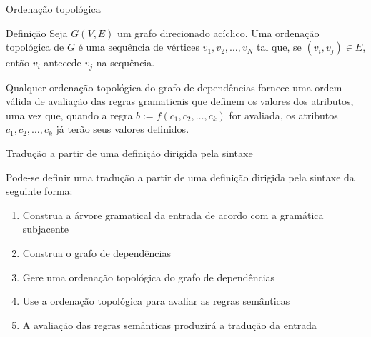 \begin{frame}[fragile]{Ordenação topológica}

    \begin{block}{Definição}
        Seja $G(V, E)$ um grafo direcionado acíclico. Uma ordenação topológica de $G$ é uma sequência de vértices $v_1, v_2, \ldots, v_N$ tal que, se 
            $(v_i, v_j)\in E$, então $v_i$ antecede $v_j$ na sequência.
    \end{block}

    \vspace{0.2in}

    Qualquer ordenação topológica do grafo de dependências fornece uma ordem válida de avaliação das regras gramaticais que definem os valores dos atributos, uma
        vez que, quando a regra $b := f(c_1, c_2, \ldots, c_k)$ for avaliada, os atributos $c_1, c_2, \ldots, c_k$ já terão seus valores definidos.
\end{frame}

\begin{frame}[fragile]{Tradução a partir de uma definição dirigida pela sintaxe}

    Pode-se definir uma tradução a partir de uma definição dirigida pela sintaxe da seguinte forma:

    \vspace{0.2in}

    \begin{enumerate}
        \item Construa a árvore gramatical da entrada de acordo com a gramática subjacente

        \item Construa o grafo de dependências

        \item Gere uma ordenação topológica do grafo de dependências

        \item Use a ordenação topológica para avaliar as regras semânticas

        \item A avaliação das regras semânticas produzirá a tradução da entrada
    \end{enumerate}

\end{frame}
